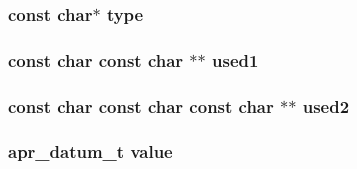 \subsubsection[{\texorpdfstring{type}{type}}]{\setlength{\rightskip}{0pt plus 5cm}const char$\ast$ type}\hypertarget{group__APR__Util__DBM_ga763fd8db6bba8fbbbc113ca0d61c47c2}{}\label{group__APR__Util__DBM_ga763fd8db6bba8fbbbc113ca0d61c47c2}
\subsubsection[{\texorpdfstring{used1}{used1}}]{\setlength{\rightskip}{0pt plus 5cm}const char const char $\ast$$\ast$ used1}\hypertarget{group__APR__Util__DBM_gae1e64da159a1d4114c6c5c4b2568cc66}{}\label{group__APR__Util__DBM_gae1e64da159a1d4114c6c5c4b2568cc66}
\subsubsection[{\texorpdfstring{used2}{used2}}]{\setlength{\rightskip}{0pt plus 5cm}const char const char const char $\ast$$\ast$ used2}\hypertarget{group__APR__Util__DBM_gad076b56c48879e14e0daddd60ff3eb8c}{}\label{group__APR__Util__DBM_gad076b56c48879e14e0daddd60ff3eb8c}
\subsubsection[{\texorpdfstring{value}{value}}]{ {\bf apr\+\_\+datum\+\_\+t} value}\hypertarget{group__APR__Util__DBM_gadc340d19528d957d4c7e16bc8bc70b2d}{}\label{group__APR__Util__DBM_gadc340d19528d957d4c7e16bc8bc70b2d}
